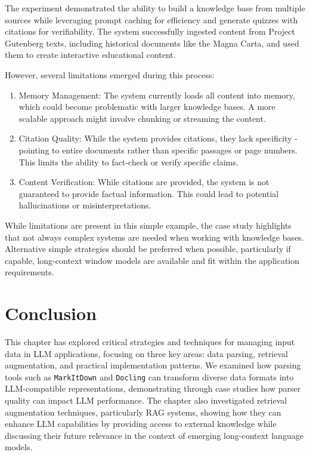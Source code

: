 The experiment demonstrated the ability to build a knowledge base from multiple sources while leveraging prompt caching for efficiency and generate quizzes with citations for verifiability. The system successfully ingested content from Project Gutenberg texts, including historical documents like the Magna Carta, and used them to create interactive educational content.

However, several limitations emerged during this process:

\begin{enumerate}
\item Memory Management: The system currently loads all content into memory, which could become problematic with larger knowledge bases. A more scalable approach might involve chunking or streaming the content.

\item Citation Quality: While the system provides citations, they lack specificity - pointing to entire documents rather than specific passages or page numbers. This limits the ability to fact-check or verify specific claims.

\item Content Verification: While citations are provided, the system is not guaranteed to provide factual information. This could lead to potential hallucinations or misinterpretations.
\end{enumerate}

While limitations are present in this simple example, the case study highlights that not always complex systems are needed when working with knowledge bases. Alternative simple strategies should be preferred when possible, particularly if capable, long-context window models are available and fit within the application requirements.

\section{Conclusion}
This chapter has explored critical strategies and techniques for managing input data in LLM applications, focusing on three key areas: data parsing, retrieval augmentation, and practical implementation patterns. We examined how parsing tools such as \texttt{MarkItDown} and \texttt{Docling} can transform diverse data formats into LLM-compatible representations, demonstrating through case studies how parser quality can impact LLM performance. The chapter also investigated retrieval augmentation techniques, particularly RAG systems, showing how they can enhance LLM capabilities by providing access to external knowledge while discussing their future relevance in the context of emerging long-context language models.

